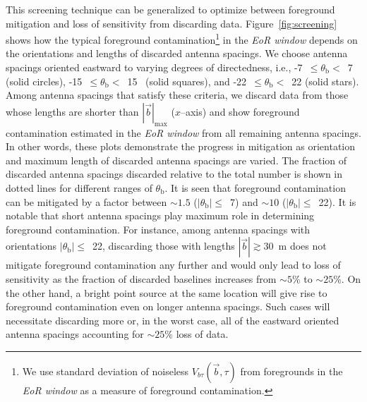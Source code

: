 \documentclass[preprint2,iop,numberedappendix]{emulateapj}
\begin{document}
This screening technique can be generalized to optimize between foreground mitigation and loss of sensitivity from discarding data. Figure~\ref{fig:screening} shows how the typical foreground contamination\footnote{We use standard deviation of noiseless $V_{b\tau}(\vec{b},\tau)$ from foregrounds in the {\it EoR window} as a measure of foreground contamination.} in the {\it EoR window} depends on the orientations and lengths of discarded antenna spacings. We choose antenna spacings oriented eastward to varying degrees of directedness, i.e., -7~$\le\theta_\textrm{b}<$~7 (solid circles), -15\arcdeg~$\le\theta_\textrm{b}<$~15\arcdeg~ (solid squares), and -22~$\le\theta_\textrm{b}<$~22 (solid stars). Among antenna spacings that satisfy these criteria, we discard data from those whose lengths are shorter than $|\vec{b}|_\textrm{max}$ ($x$--axis) and show foreground contamination estimated in the {\it EoR window} from all remaining antenna spacings. In other words, these plots demonstrate the progress in mitigation as orientation and maximum length of discarded antenna spacings are varied. %
The fraction of discarded antenna spacings discarded relative to the total number is shown in dotted lines for different ranges of $\theta_\textrm{b}$. It is seen that foreground contamination can be mitigated by a factor between $\sim 1.5$ ($|\theta_\textrm{b}|\le$~7) and $\sim 10$ ($|\theta_\textrm{b}|\le$~22). It is notable that short antenna spacings play maximum role in determining foreground contamination. For instance, among antenna spacings with orientations $|\theta_\textrm{b}|\le$~22, discarding those with lengths $|\vec{b}|\gtrsim 30$~m does not mitigate foreground contamination any further and would only lead to loss of sensitivity as the fraction of discarded baselines increases from $\sim 5$\% to $\sim 25$\%. On the other hand, a bright point source at the same location will give rise to foreground contamination even on longer antenna spacings. Such cases will necessitate discarding more or, in the worst case, all of the eastward oriented antenna spacings accounting for $\sim 25$\% loss of data.
\end{document}
